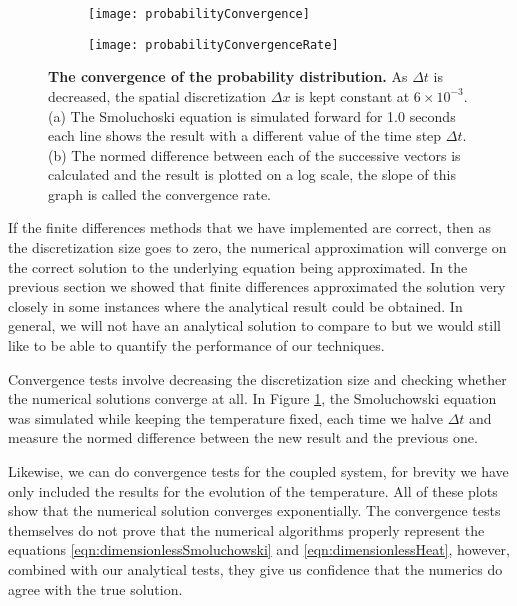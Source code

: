 \begin{figure}
	\begin{subfigure}{0.49\textwidth}
		\texttt{[image: probabilityConvergence]}
	\end{subfigure}
	\begin{subfigure}{0.49\textwidth}
		\texttt{[image: probabilityConvergenceRate]}
	\end{subfigure}
\caption{\textbf{The convergence of the probability distribution.} As $\Delta t$ is decreased, the spatial discretization $\Delta x$ is kept constant at $6 \times 10^{-3}$. (a) The Smoluchoski equation is simulated forward for 1.0 seconds each line shows the result with a different value of the time step $\Delta t$. (b) The normed difference between each of the successive vectors is calculated and the result is plotted on  a log scale, the slope of this graph is called the convergence rate.}
\label{fig:Convergence}
\end{figure}

If the finite differences methods that we have implemented are correct, then as the discretization size goes to zero, the numerical approximation will converge on the correct solution to the underlying equation being approximated. In the previous section we showed that finite differences approximated the solution very closely in some instances where the analytical result could be obtained. In general, we will not have an analytical solution to compare to but we would still like to be able to quantify the performance of our techniques.

Convergence tests involve decreasing the discretization size and checking whether the numerical solutions converge at all. In Figure \ref{fig:Convergence}, the Smoluchowski equation was simulated while keeping the temperature fixed, each time we halve $\Delta t$ and measure the normed difference between the new result and the previous one.

Likewise, we can do convergence tests for the coupled system, for brevity we have only included the results for the evolution of the temperature. All of these plots show that the numerical solution converges exponentially. The convergence tests themselves do not prove that the numerical algorithms properly represent the equations \ref{eqn:dimensionlessSmoluchowski} and \ref{eqn:dimensionlessHeat}, however, combined with our analytical tests, they give us confidence that the numerics do agree with the true solution.

